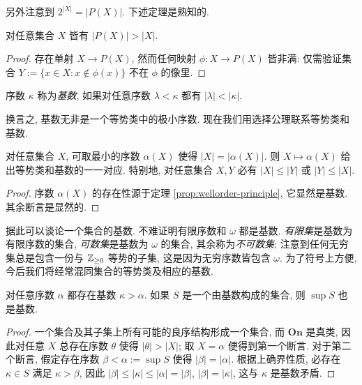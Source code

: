 另外注意到 $2^{|X|} = |P(X)|$. 下述定理是熟知的.

\begin{theorem}[Cantor]\label{prop:Cantor}
	对任意集合 $X$ 皆有 $|P(X)| > |X|$.
\end{theorem}
\begin{proof}
	存在单射 $X \to P(X)$, 然而任何映射 $\phi: X \to P(X)$ 皆非满: 仅需验证集合 $Y := \{x \in X : x \notin \phi(x) \}$ 不在 $\phi$ 的像里.
\end{proof}

\begin{definition}
	序数 $\kappa$ 称为\emph{基数}, 如果对任意序数 $\lambda < \kappa$ 都有 $|\lambda| < |\kappa|$.
\end{definition}
换言之, 基数无非是一个等势类中的极小序数. 现在我们用选择公理联系等势类和基数.

\begin{proposition}
	对任意集合 $X$, 可取最小的序数 $\alpha(X)$ 使得 $|X|=|\alpha(X)|$. 则 $X \mapsto \alpha(X)$ 给出等势类和基数的一一对应. 特别地, 对任意集合 $X, Y$ 必有 $|X| \leq |Y|$ 或 $|Y| \leq |X|$.
\end{proposition}
\begin{proof}
  序数 $\alpha(X)$ 的存在性源于定理 \ref{prop:wellorder-principle}, 它显然是基数. 其余断言是显然的. 
\end{proof}

据此可以谈论一个集合的基数. 不难证明有限序数和 $\omega$ 都是基数. \emph{有限集}是基数为有限序数的集合, \emph{可数集}是基数为 $\omega$ 的集合, 其余称为\emph{不可数集}; 注意到任何无穷集总是包含一份与 $\mathbb{Z}_{\geq 0}$ 等势的子集, 这是因为无穷序数皆包含 $\omega$. 为了符号上方便, 今后我们将经常混同集合的等势类及相应的基数. 

\begin{lemma}\label{prop:cardinal-sup}
	对任意序数 $\alpha$ 都存在基数 $\kappa > \alpha$. 如果 $S$ 是一个由基数构成的集合, 则 $\sup S$ 也是基数.
\end{lemma}
\begin{proof}
	一个集合及其子集上所有可能的良序结构形成一个集合, 而 $\textbf{On}$ 是真类, 因此对任意 $X$ 总存在序数 $\theta$ 使得 $|\theta| > |X|$; 取 $X=\alpha$ 便得到第一个断言. 对于第二个断言, 假定存在序数 $\beta < \alpha := \sup S$ 使得 $|\beta| = |\alpha|$. 根据上确界性质, 必存在 $\kappa \in S$ 满足 $\kappa > \beta$, 因此 $|\beta| \leq |\kappa| \leq |\alpha| = |\beta|$, $|\beta|=|\kappa|$, 这与 $\kappa$ 是基数矛盾.
\end{proof}

